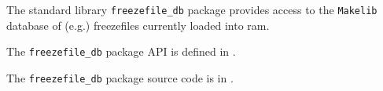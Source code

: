 
The standard library {\tt freezefile\_db} package provides access to the {\tt Makelib} 
database of (e.g.) freezefiles currently loaded into ram.

The {\tt freezefile\_db} package API is defined in .

The {\tt freezefile\_db} package source code is in .




